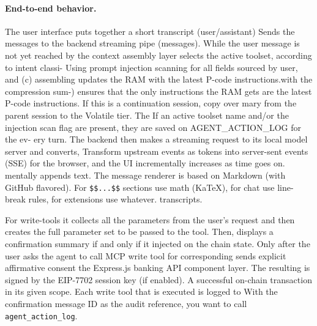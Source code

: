 \documentclass[12pt,a4paper]{article}
\begin{document}
\paragraph{End-to-end behavior.}
The user interface puts together a short transcript (user/assistant) Sends the messages to the backend streaming pipe (messages). While the user message is not yet reached by the context assembly layer selects the active toolset, according to intent classi- Using prompt injection scanning for all fields sourced by user, and (c) assembling updates the RAM with the latest P-code instructions.with the compression sum-) ensures that the only instructions the RAM gets are the latest P-code instructions. If this is a continuation session, copy over mary from the parent session to the Volatile tier. The If an active toolset name and/or the injection scan flag are present, they are saved on AGENT\_ACTION\_LOG for the ev- ery turn. The backend then makes a streaming request to its local model server and converts, Transform upstream events as tokens into server-sent events (SSE) for the browser, and the UI incrementally increases as time goes on. mentally appends text. The message renderer is based on Markdown (with GitHub flavored). For \texttt{\$\$...\$\$} sections use math (KaTeX), for chat use line-break rules, for extensions use whatever. transcripts.

For write-tools it collects all the parameters from the user's request and then creates the full parameter set to be passed to the tool. Then, displays a confirmation summary if and only if it injected on the chain state. Only after the user asks the agent to call MCP write tool for corresponding sends explicit affirmative consent the Express.js banking API component layer. The resulting is signed by the EIP-7702 session key (if enabled). A successful on-chain transaction in its given scope. Each write tool that is executed is logged to With the confirmation message ID as the audit reference, you want to call \texttt{agent\_action\_log}.
\end{document}
